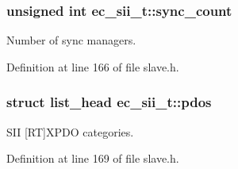 \subsubsection[{sync\-\_\-count}]{\setlength{\rightskip}{0pt plus 5cm}unsigned int {\bf ec\-\_\-sii\-\_\-t\-::sync\-\_\-count}}\label{structec__sii__t_add5337cd03f09660a3bfe91e4047ed2c}


\-Number of sync managers. 



\-Definition at line 166 of file slave.\-h.

\subsubsection[{pdos}]{\setlength{\rightskip}{0pt plus 5cm}struct list\-\_\-head {\bf ec\-\_\-sii\-\_\-t\-::pdos}}\label{structec__sii__t_a769c826981c5b3d1ee52245131537b15}


\-S\-I\-I [\-R\-T]\-X\-P\-D\-O categories. 



\-Definition at line 169 of file slave.\-h.

